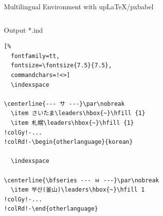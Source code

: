 \documentclass[aspectratio=169,10pt]{beamer}
\begin{document}
\begin{frame}[fragile]{Multilingual Environment with upLaTeX/pxbabel}
\begin{columns}
\begin{column}{60mm}
\begin{exampleblock}{Output *.ind}
\begin{Verbatim}[%
  fontfamily=tt,
  fontsize=\fontsize{7.5}{7.5},
  commandchars=!<>]
  \indexspace

\centerline{--- サ ---}\par\nobreak
  \item さいたま\leaders\hbox{~}\hfill {1}
  \item 札幌\leaders\hbox{~}\hfill {1}
!colGy!-...
!colRd!-\begin{otherlanguage}{korean}

  \indexspace

\centerline{\bfseries --- ㅂ ---}\par\nobreak
  \item 부산(釜山)\leaders\hbox{~}\hfill 1
!colGy!-...
!colRd!-\end{otherlanguage}
\end{Verbatim}
\end{exampleblock}
\end{column}
\end{columns}

\end{frame}

\end{document}
